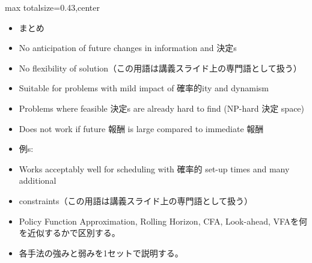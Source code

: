 \clearpage
{}
\begin{minipage}[t]{0.405\textwidth}
\begin{adjustbox}{max totalsize={\textwidth}{0.43\textheight},center}
\begin{minipage}{\textwidth}\scriptsize
{}\begin{itemize}
\item まとめ
\item No anticipation of future changes in information and 決定s
\item No flexibility of solution（この用語は講義スライド上の専門語として扱う）
\item Suitable for problems with mild impact of 確率的ity and dynamism
\item Problems where feasible 決定s are already hard to find (NP-hard 決定 space)
\item Does not work if future 報酬 is large compared to immediate 報酬
\item 例s:
\item Works acceptably well for scheduling with 確率的 set-up times and many additional
\item constraints（この用語は講義スライド上の専門語として扱う）
\end{itemize}\begin{itemize}
\item Policy Function Approximation, Rolling Horizon, CFA, Look-ahead, VFAを何を近似するかで区別する。
\item 各手法の強みと弱みを1セットで説明する。
\end{itemize}
\end{minipage}
\end{adjustbox}
\end{minipage}\hfill
